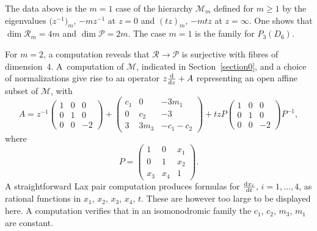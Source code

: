 \documentclass[pdftex]{sigma}
\numberwithin{equation}{section}
\begin{document}
The data above is the $m=1$ case of the hierarchy $\mathcal{M}_m$ defined for $m\geq 1$ by the eigenvalues
 $\bigl(z^{-1}\bigr)_m$, $-mz^{-1}$ at $z=0$ and $(tz)_m$, $-mtz$ at $z=\infty$. One shows that $\dim \mathcal{R}_m=4m$ and
 $\dim \mathcal{P}=2m$. The case $m=1$ is the family for $P_3(D_6)$.

 For $m=2$, a computation reveals that $\mathcal{R}\rightarrow \mathcal{P}$ is surjective with fibres of dimension~4. A~computation of $\mathcal{M}$, indicated in Section~\ref{section0},
and a choice of normalizations give rise to an operator $z\frac{{\rm d}}{{\rm d}z}+A$ representing an open affine subset of $\mathcal{M}$, with
 \[ A=z^{-1} \begin{pmatrix} 1&0 &0 \\ 0&1 & 0\\ 0&0 &-2 \end{pmatrix}+
\begin{pmatrix}c_1& 0&-3m_{1} \\ 0&c_2 & -3\\ 3& 3m_{3}&-c_1-c_2 \end{pmatrix}+
 tz P \begin{pmatrix} 1&0 &0 \\ 0&1 & 0\\ 0&0 &-2 \end{pmatrix}P^{-1} ,\]
where
\[
P=\left(\begin{matrix}1 &0 &x_1 \\ 0&1 &x_2 \\ x_3&x_4 & 1\end{matrix}\right).
\]
A straightforward Lax pair computation produces formulas for $\frac{{\rm d}x_i}{{\rm d}t}$, $i=1,\dots,4$, as rational functions in
$x_1$, $x_2$, $x_3$, $x_4$, $t$. These are however too large to be displayed here.
A computation verifies that in an isomonodromic family the $c_1$, $c_2$, $m_{3}$, $m_{1}$ are constant.
\end{document}
